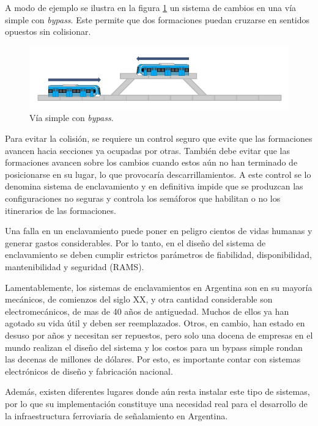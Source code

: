 		A modo de ejemplo se ilustra en la figura \ref{fig:Bypass} un sistema de cambios en una vía simple con \emph{bypass}. Este permite que dos formaciones puedan cruzarse en sentidos opuestos sin colisionar.
	
		\begin{figure}[h!]
			\centering
			\includegraphics[scale=.45]{./Figures/Bypass_2}
			\caption{Vía simple con \textit{bypass}.}
			\label{fig:Bypass}
		\end{figure}
			
		Para evitar la colisión, se requiere un control seguro que evite que las formaciones avancen hacia secciones ya ocupadas por otras. También debe evitar que las formaciones avancen sobre los cambios cuando estos aún no han terminado de posicionarse en su lugar, lo que provocaría descarrillamientos. A este control se lo denomina sistema de enclavamiento y en definitiva impide que se produzcan las configuraciones no seguras y controla los semáforos que habilitan o no los itinerarios de las formaciones.		
					 
	 	Una falla en un enclavamiento puede poner en peligro cientos de vidas humanas y generar gastos considerables. Por lo tanto, en el diseño del sistema de enclavamiento se deben cumplir estrictos parámetros de fiabilidad, disponibilidad, mantenibilidad y seguridad (RAMS).
	 	
	 	Lamentablemente, los sistemas de enclavamientos en Argentina son en su mayoría mecánicos, de comienzos del siglo XX, y otra cantidad considerable son electromecánicos, de mas de 40 años de antiguedad. Muchos de ellos ya han agotado su vida útil y deben ser reemplazados. Otros, en cambio, han estado en desuso por años y necesitan ser repuestos, pero solo una docena de empresas en el mundo realizan el diseño del sistema y los costos para un bypass simple rondan las decenas de millones de dólares. Por esto, es importante contar con sistemas electrónicos de diseño y fabricación nacional.

		Además, existen diferentes lugares donde aún resta instalar este tipo de sistemas, por lo que su implementación constituye una necesidad real para el desarrollo de la infraestructura ferroviaria de señalamiento en Argentina.		
	
